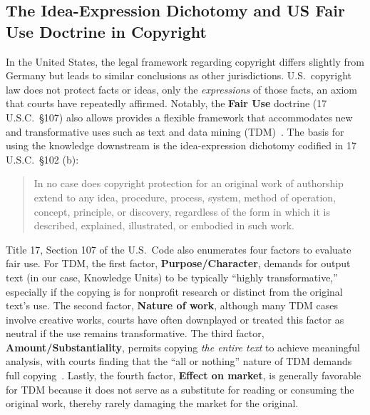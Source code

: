 \subsection{The Idea-Expression Dichotomy and US Fair Use Doctrine in Copyright}

In the United States, the legal framework regarding copyright differs slightly from Germany but leads to similar conclusions as other jurisdictions. U.S.\ copyright law does not protect facts or ideas, only the \emph{expressions} of those facts, an axiom that courts have repeatedly affirmed. Notably, the \textbf{Fair Use} doctrine (17 U.S.C.\ \S107) also allows provides a flexible framework that accommodates new and transformative uses such as text and data mining (TDM)~\citep{USfairuseTDM2015, reichman2012copyright}. The basis for using the knowledge downstream is the idea-expression dichotomy \citep{yen1989first} codified in 17 U.S.C.\ \S102 (b):  
\vspace{-1.1em}
\begin{quote}
    In no case does copyright protection for an original work of authorship extend to any idea, procedure, process, system, method of operation, concept, principle, or discovery, regardless of the form in which it is described, explained, illustrated, or embodied in such work.
\end{quote}
\vspace{-0.5em}
Title 17, Section 107 of the U.S.\ Code also enumerates four factors to evaluate fair use. For TDM, the first factor, \textbf{Purpose/Character}, demands for output text (in our case, Knowledge Units) to be typically “highly transformative,” especially if the copying is for nonprofit research or distinct from the original text’s use. The second factor, \textbf{Nature of work}, although many TDM cases involve creative works, courts have often downplayed or treated this factor as neutral if the use remains transformative. The third factor, \textbf{Amount/Substantiality}, permits copying \emph{the entire text} to achieve meaningful analysis, with courts finding that the “all or nothing” nature of TDM demands full copying~\citep{USfairuseTDM2015}. Lastly, the fourth factor, \textbf{Effect on market}, is generally favorable for TDM because it does not serve as a substitute for reading or consuming the original work, thereby rarely damaging the market for the original.

